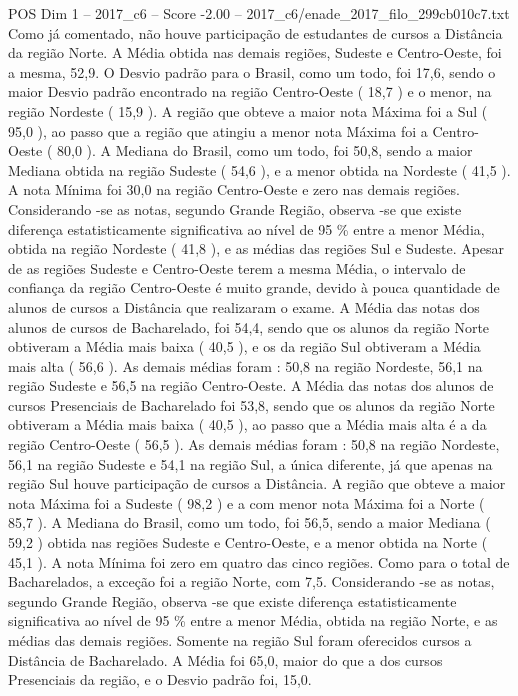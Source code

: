 \begin{textsample}{POS Dim 1 – 2017\_c6 – Score -2.00 – 2017\_c6/enade\_2017\_filo\_299cb010c7.txt}
Como já comentado, não houve participação de estudantes de cursos a Distância da região Norte.
A Média obtida nas demais regiões, Sudeste e Centro-Oeste, foi a mesma, 52,9.
O Desvio padrão para o Brasil, como um todo, foi 17,6, sendo o maior Desvio padrão encontrado na região Centro-Oeste ( 18,7 ) e o menor, na região Nordeste ( 15,9 ).
A região que obteve a maior nota Máxima foi a Sul ( 95,0 ), ao passo que a região que atingiu a menor nota Máxima foi a Centro-Oeste ( 80,0 ).
A Mediana do Brasil, como um todo, foi 50,8, sendo a maior Mediana obtida na região Sudeste ( 54,6 ), e a menor obtida na Nordeste ( 41,5 ).
A nota Mínima foi 30,0 na região Centro-Oeste e zero nas demais regiões.
Considerando -se as notas, segundo Grande Região, observa -se que existe diferença estatisticamente significativa ao nível de 95 \% entre a menor Média, obtida na região Nordeste ( 41,8 ), e as médias das regiões Sul e Sudeste.
Apesar de as regiões Sudeste e Centro-Oeste terem a mesma Média, o intervalo de confiança da região Centro-Oeste é muito grande, devido à pouca quantidade de alunos de cursos a Distância que realizaram o exame.
A Média das notas dos alunos de cursos de Bacharelado, foi 54,4, sendo que os alunos da região Norte obtiveram a Média mais baixa ( 40,5 ), e os da região Sul obtiveram a Média mais alta ( 56,6 ).
As demais médias foram : 50,8 na região Nordeste, 56,1 na região Sudeste e 56,5 na região Centro-Oeste.
A Média das notas dos alunos de cursos Presenciais de Bacharelado foi 53,8, sendo que os alunos da região Norte obtiveram a Média mais baixa ( 40,5 ), ao passo que a Média mais alta é a da região Centro-Oeste ( 56,5 ).
As demais médias foram : 50,8 na região Nordeste, 56,1 na região Sudeste e 54,1 na região Sul, a única diferente, já que apenas na região Sul houve participação de cursos a Distância.
A região que obteve a maior nota Máxima foi a Sudeste ( 98,2 ) e a com menor nota Máxima foi a Norte ( 85,7 ).
A Mediana do Brasil, como um todo, foi 56,5, sendo a maior Mediana ( 59,2 ) obtida nas regiões Sudeste e Centro-Oeste, e a menor obtida na Norte ( 45,1 ).
A nota Mínima foi zero em quatro das cinco regiões.
Como para o total de Bacharelados, a exceção foi a região Norte, com 7,5.
Considerando -se as notas, segundo Grande Região, observa -se que existe diferença estatisticamente significativa ao nível de 95 \% entre a menor Média, obtida na região Norte, e as médias das demais regiões.
Somente na região Sul foram oferecidos cursos a Distância de Bacharelado.
A Média foi 65,0, maior do que a dos cursos Presenciais da região, e o Desvio padrão foi, 15,0.

\end{textsample}
